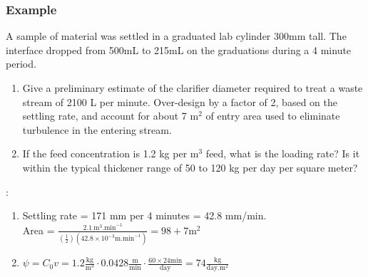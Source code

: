 \begin{frame}\frametitle{Example}
 	A sample of material was settled in a graduated lab cylinder 300mm tall. The interface dropped from 500mL to 215mL on the graduations during a 4 minute period.

	\begin{enumerate}
		\item	Give a preliminary estimate of the clarifier diameter required to treat a waste stream of 2100 L per minute. Over-design by a factor of 2, based on the settling rate, and account for about 7 $\text{m}^2$ of entry area used to eliminate turbulence in the entering stream.
		\item	If the feed concentration is 1.2 kg per $\text{m}^3$ feed, what is the loading rate? Is it within the typical thickener range of 50 to 120 kg per day per square meter? 
	\end{enumerate}
	{\color{myGreen}{Answers}}:
	\begin{enumerate}
		\item	Settling rate = 171 mm per 4 minutes = 42.8 mm/min.\\Area = $\displaystyle \frac{2.1~\text{m}^3.\text{min}^{-1}}{\left(\frac{1}{2}\right)\left(42.8 \times 10^{-3} \text{m}.\text{min}^{-1}\right)} = 98 + 7 \text{m}^2$
		\item	$\psi = C_0 v = 1.2 \displaystyle\frac{\text{kg}}{\text{m}^3} \cdot 0.0428 \displaystyle \frac{\text{m}}{\text{min}} \cdot \displaystyle\frac{60 \times 24 \text{min}}{\text{day}} = 74 \displaystyle \frac{\text{kg}}{\text{day}.\text{m}^2}$
	\end{enumerate}
\end{frame}

